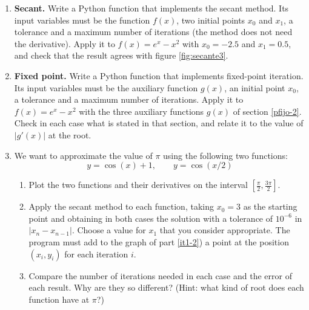 \begin{enumerate}
\item \textbf{Secant.} Write a Python function that implements the secant method. Its input variables must be the function $f(x)$, two initial points $x_0$ and $x_1$, a tolerance and a maximum number of iterations (the method does not need the derivative). Apply it to $f(x) = e^x-x^2$ with $x_0=-2.5$ and $x_1=0.5$, and check that the result agrees with figure \ref{fig:secante3}.

\item \textbf{Fixed point.} Write a Python function that implements fixed-point iteration. Its input variables must be the auxiliary function $g(x)$, an initial point $x_0$, a tolerance and a maximum number of iterations. Apply it to $f(x) = e^x-x^2$ with the three auxiliary functions $g(x)$ of section \ref{pfijo-2}. Check in each case what is stated in that section, and relate it to the value of $\vert g'(x)\vert$ at the root.

\item We want to approximate the value of $\pi$ using the following two functions:
\begin{equation*}
y=\cos(x)+1, \qquad y=\cos(x/2)
\end{equation*}
\begin{enumerate}
\item \label{it1-2}Plot the two functions and their derivatives on the interval $[\frac{\pi}{2},\frac{3\pi}{2}]$.
\item Apply the secant method to each function, taking $x_0=3$ as the starting point and obtaining in both cases the solution with a tolerance of $10^{-6}$ in $\vert x_n-x_{n-1}\vert$. Choose a value for $x_1$ that you consider appropriate.
The program must add to the graph of part \ref{it1-2}) a point at the position $(x_i,y_i)$ for each iteration $i$.
\item Compare the number of iterations needed in each case and the error of each result. Why are they so different? (Hint: what kind of root does each function have at $\pi$?)
\end{enumerate}


\end{enumerate}
